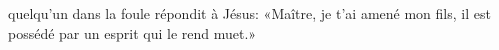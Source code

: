 \encetemps quelqu’un dans la foule répondit à Jésus:
	«Maître, je t’ai amené mon fils,
	il est possédé par un esprit qui le rend muet.»
